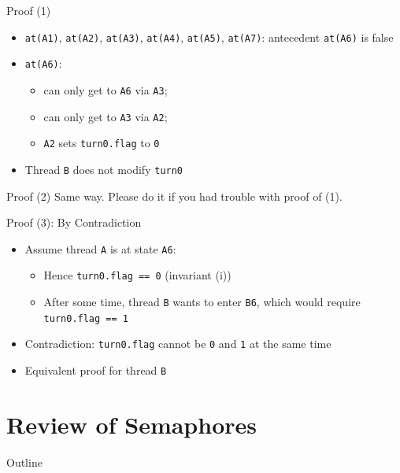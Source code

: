 \begin{frame}[fragile]{Proof (1)}
  \begin{itemize}
  \item \lstinline!at(A1)!, \lstinline!at(A2)!, \lstinline!at(A3)!,
    \lstinline!at(A4)!, \lstinline!at(A5)!, \lstinline!at(A7)!: 
    antecedent \lstinline!at(A6)! is false
  \item \lstinline!at(A6)!:
    \begin{itemize}
    \item can only get to \lstinline!A6! via \lstinline!A3!;
    \item can only get to \lstinline!A3! via \lstinline!A2!;
    \item \lstinline!A2! sets \lstinline!turn0.flag! to \lstinline!0!
    \end{itemize}
  \item Thread \lstinline!B! does not modify \lstinline!turn0!
  \end{itemize}
\end{frame}

\begin{frame}[fragile]{Proof (2)}
  Same way. Please do it if you had trouble with proof of (1).
\end{frame}

\begin{frame}[fragile]{Proof (3): By Contradiction}
  \begin{itemize}
  \item Assume thread \lstinline!A! is at state \lstinline!A6!:
    \begin{itemize}
    \item Hence \lstinline!turn0.flag == 0! (invariant (i))
    \item After some time, thread \lstinline!B! wants to enter
      \lstinline!B6!, which would require \lstinline!turn0.flag == 1!
    \end{itemize}
  \item Contradiction: \lstinline!turn0.flag! cannot be \lstinline!0!
    and \lstinline!1! at the same time
  \item Equivalent proof for thread \lstinline!B!
  \end{itemize}
\end{frame}


\section{Review of Semaphores}

\begin{frame}{Outline}
  \tableofcontents[current]
\end{frame}

